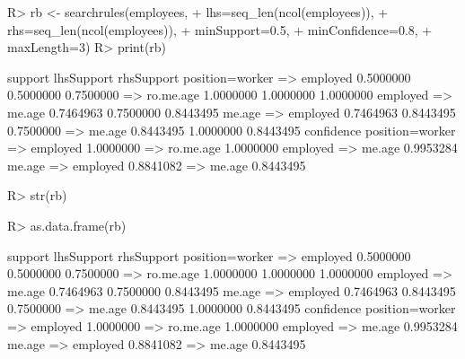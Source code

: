 \documentclass{article}\usepackage[]{graphicx}\usepackage[]{color}
\begin{document}
\begin{Schunk}
% --begin: "searchrules"
\begin{Sinput}
R> rb <- searchrules(employees,
+                    lhs=seq_len(ncol(employees)),
+                    rhs=seq_len(ncol(employees)),
+                    minSupport=0.5,
+                    minConfidence=0.8,
+                    maxLength=3)
R> print(rb)
\end{Sinput}
\begin{Soutput}
                              support lhsSupport rhsSupport
position=worker => employed 0.5000000  0.5000000  0.7500000
 => ro.me.age               1.0000000  1.0000000  1.0000000
employed => me.age          0.7464963  0.7500000  0.8443495
me.age => employed          0.7464963  0.8443495  0.7500000
 => me.age                  0.8443495  1.0000000  0.8443495
                            confidence
position=worker => employed  1.0000000
 => ro.me.age                1.0000000
employed => me.age           0.9953284
me.age => employed           0.8841082
 => me.age                   0.8443495
\end{Soutput}
%
% --end: "searchrules"
\end{Schunk}

\begin{Schunk}
% --begin: "searchrules2"
\begin{Sinput}
R> str(rb)
\end{Sinput}
%
% --end: "searchrules2"
\end{Schunk}

\begin{Schunk}
% --begin: "searchrules3"
\begin{Sinput}
R> as.data.frame(rb)
\end{Sinput}
\begin{Soutput}
                              support lhsSupport rhsSupport
position=worker => employed 0.5000000  0.5000000  0.7500000
 => ro.me.age               1.0000000  1.0000000  1.0000000
employed => me.age          0.7464963  0.7500000  0.8443495
me.age => employed          0.7464963  0.8443495  0.7500000
 => me.age                  0.8443495  1.0000000  0.8443495
                            confidence
position=worker => employed  1.0000000
 => ro.me.age                1.0000000
employed => me.age           0.9953284
me.age => employed           0.8841082
 => me.age                   0.8443495
\end{Soutput}
%
% --end: "searchrules3"
\end{Schunk}
\end{document}
